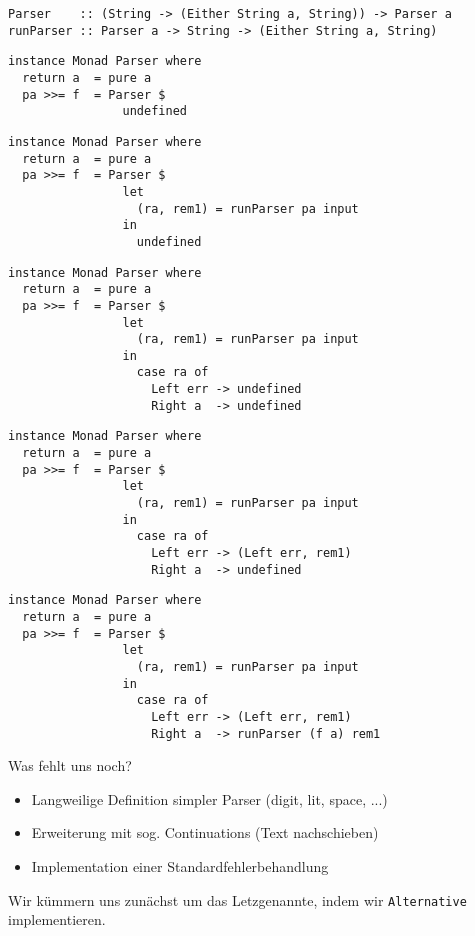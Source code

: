 \documentclass{beamer}
\begin{document}
\begin{frame}[fragile]
\begin{verbatim}
Parser    :: (String -> (Either String a, String)) -> Parser a
runParser :: Parser a -> String -> (Either String a, String)
\end{verbatim}
\begin{overprint}
\begin{verbatim}
instance Monad Parser where
  return a  = pure a
  pa >>= f  = Parser $ 
                undefined
\end{verbatim}
\begin{verbatim}
instance Monad Parser where
  return a  = pure a
  pa >>= f  = Parser $ 
                let
                  (ra, rem1) = runParser pa input
                in
                  undefined
\end{verbatim}
\begin{verbatim}
instance Monad Parser where
  return a  = pure a
  pa >>= f  = Parser $ 
                let
                  (ra, rem1) = runParser pa input
                in
                  case ra of
                    Left err -> undefined
                    Right a  -> undefined
\end{verbatim}
\begin{verbatim}
instance Monad Parser where
  return a  = pure a
  pa >>= f  = Parser $ 
                let
                  (ra, rem1) = runParser pa input
                in
                  case ra of
                    Left err -> (Left err, rem1)
                    Right a  -> undefined
\end{verbatim}
\begin{verbatim}
instance Monad Parser where
  return a  = pure a
  pa >>= f  = Parser $ 
                let
                  (ra, rem1) = runParser pa input
                in
                  case ra of
                    Left err -> (Left err, rem1)
                    Right a  -> runParser (f a) rem1
\end{verbatim}
\end{overprint}
\end{frame}

\begin{frame}[fragile]
Was fehlt uns noch?\\
\pause
\begin{itemize}
 \item Langweilige Definition simpler Parser (digit, lit, space, ...)
 \pause
 \item Erweiterung mit sog. Continuations (Text \glqq nachschieben\grqq)
 \pause
 \item Implementation einer Standardfehlerbehandlung
\end{itemize}
\pause
Wir kümmern uns zunächst um das Letzgenannte, indem wir \texttt{Alternative} implementieren.
\end{frame}
\end{document}
